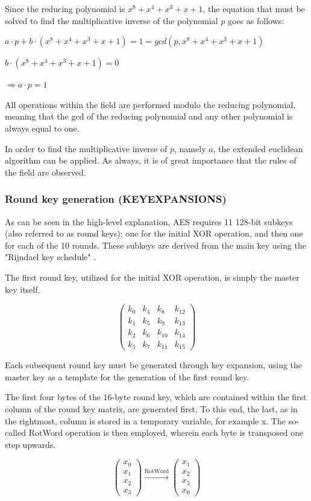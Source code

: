 \documentclass[12pt]{report}
\theoremstyle{definition}
\theoremstyle{remark}
\begin{document}
Since the reducing polynomial is $x^8+x^4+x^3+x+1$, the equation that must be solved to find the multiplicative inverse of the polynomial $p$ goes as follows:

$a \cdot p+b \cdot (x^8+x^4+x^3+x+1) = 1 = gcd(p, x^8+x^4+x^3+x+1)$

$b \cdot ( x^8+x^4+x^3+x+1) = 0$

$\Rightarrow a \cdot p = 1$

All operations within the field are performed modulo the reducing polynomial, meaning that the gcd of the reducing polynomial and any other polynomial is always equal to one.

In order to find the multiplicative inverse of $p$, namely $a$, the extended euclidean algorithm can be applied. As always, it is of great importance that the rules of the field are observed.

\subsubsection{Round key generation (KEYEXPANSIONS)}
As can be seen in the high-level explanation, AES requires 11 128-bit subkeys (also referred to as round keys); one for the initial XOR operation, and then one for each of the 10 rounds. These subkeys are derived from the main key using the "Rijndael key schedule" \cite{KeySchedule}.


The first round key, utilized for the initial XOR operation, is simply the master key itself.

\[ \left( \begin{array}{cccc}
k_0 & k_4 & k_8 & k_{12} \\
k_1 & k_5 & k_9 & k_{13} \\
k_2 & k_6 & k_{10} & k_{14} \\
k_3 & k_7 & k_{11} & k_{15}\end{array} \right)\] 

Each subsequent round key must be generated through key expansion, using the master key as a template for the generation of the first round key.

The first four bytes of the 16-byte round key, which are contained within the first column of the round key matrix, are generated first. To this end, the last, as in the rightmost, column is stored in a temporary variable, for example x. The so-called RotWord operation is then employed, wherein each byte is transposed one step upwards.

\[
\left( \begin{array}{c}
x_0 \\
x_1 \\
x_2 \\
x_3\end{array} \right)
\xrightarrow{\text{RotWord}}
\left( \begin{array}{c}
x_1 \\
x_2 \\
x_3 \\
x_0\end{array} \right)
\]
\end{document}
